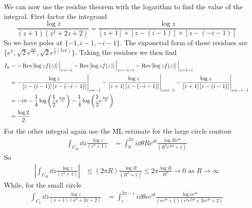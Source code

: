\documentclass[a4paper,12pt]{article}
\begin{document}
We can now use the residue theorem with the logarithm to find the value of the integral. First factor the integrand
\begin{equation}
\frac{\log z}{(z+1)(z^2+2z+2)}= \frac{\log z}{[z+1]\times \left[z-(i-1)\right]\times \left[z-(-i-1)\right]}
\end{equation}
So we have poles at $\{-1,i-1,-i-1\}$. The exponetial form of these residues are  $\{e^{\pi},\sqrt{2} e^{\frac{3 i \pi }{4}},\sqrt{2} e^{\frac{1}{4} (5 i \pi )}\}$. Taking the residues we then find
\begin{equation}
	\begin{aligned}
	I_a&=-\Res\left[\log z f(z)\right]\Big|_{z=-1}-\Res\left[\log zf(z)\right]\Big|_{z=-1-i}-\Res\left[\log zf(z)\right]\Big|_{z=1-i}\\
	&=-\frac{\log z}{\left[z-(i-1)\right] \left[z-(-i-1)\right]}\Bigg|_{z=-1}-\frac{\log z}{\left[z+1\right] \left[z-(-i-1)\right]}\Bigg|_{z=i-1}-\frac{\log z}{\left[z+1\right] \left[z-(i-1)\right]}\Bigg|_{z=-i-1}\\
	&=-i \pi -\frac{1}{4} \log \left(\frac{1}{2}e^{\frac{5 i \pi }{4}}\right)-\frac{1}{4} \log \left(\frac{1}{2} e^{\frac{3 i \pi }{4}}\right)\\
	&=\frac{\log 2}{2}	\end{aligned}
\end{equation}
For the other integral again use the ML estimate for the large circle contour
\begin{equation}
	\begin{aligned}
		\int_{C_R} \dd z \frac{\log z}{(z^3+1)}&=\int_{0}^{2\pi} i\dd \theta R e^{i\theta} \frac{\log Re^{i\theta}}{(R^3e^{3i\theta}+1)}
	\end{aligned}
\end{equation}
So
\begin{equation}
	\begin{aligned}
		\left|\int_{C_R} \dd z \frac{\log z}{(z^3+1)}\right|&\leq(2\pi R)
		\frac{\log R}{(R^3+1)}\leq2\pi \frac{\log R}{R^2}\to 0 \text{ as } R\to\infty
	\end{aligned}
\end{equation}
While, for the small circle
\begin{equation}
	\begin{aligned}
		\int_{C_\epsilon} \dd z \frac{\log z}{(x+1)(x^2+2x+2)}&=\int_{\epsilon}^{2\pi-\epsilon} i\dd \theta \epsilon e^{i\theta} \frac{\log \epsilon e^{i\theta}}{(\epsilon e^{i\theta}+1)(\epsilon ^2e^{2i\theta}+2\epsilon e^{i\theta}+2)}\\
	\end{aligned}
\end{equation}
\end{document}
